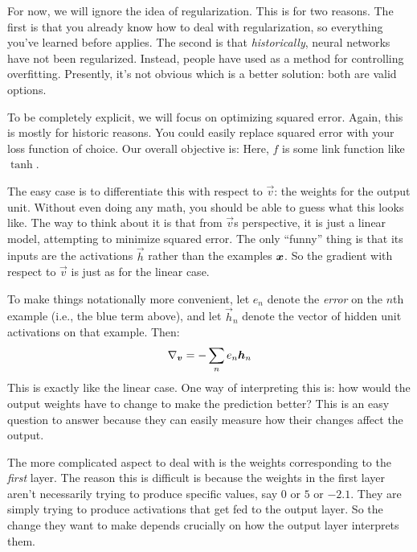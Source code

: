 For now, we will ignore the idea of regularization.  This is for two
reasons.  The first is that you already know how to deal with
regularization, so everything you've learned before applies.  The
second is that \emph{historically}, neural networks have not been
regularized.  Instead, people have used  as a
method for controlling overfitting.  Presently, it's not obvious which
is a better solution: both are valid options.

To be completely explicit, we will focus on optimizing squared error.
Again, this is mostly for historic reasons.  You could easily replace
squared error with your loss function of choice.  Our overall
objective is:
%
%
Here, $f$ is some link function like $\tanh$.

The easy case is to differentiate this with respect to $\vec v$: the
weights for the output unit.  Without even doing any math, you should
be able to guess what this looks like.  The way to think about it is
that from $\vec v$s perspective, it is just a linear model, attempting
to minimize squared error.  The only ``funny'' thing is that its
inputs are the activations $\vec h$ rather than the examples ${\boldsymbol{x}}$.
So the gradient with respect to $\vec v$ is just as for the linear
case.

To make things notationally more convenient, let $e_n$ denote the
\emph{error} on the $n$th example (i.e., the blue term above), and let
$\vec h_n$ denote the vector of hidden unit activations on that
example.  Then:
%
\begin{equation}
\nabla_{\boldsymbol{v}} = -\sum_n e_n \boldsymbol{h}_n 
\end{equation}
%
This is exactly like the linear case.  One way of interpreting this
is: how would the output weights have to change to make the prediction
better?  This is an easy question to answer because they can easily
measure how their changes affect the output.

The more complicated aspect to deal with is the weights corresponding
to the \emph{first} layer.  The reason this is difficult is because
the weights in the first layer aren't necessarily trying to produce
specific values, say $0$ or $5$ or $-2.1$.  They are simply trying to
produce activations that get fed to the output layer.  So the change
they want to make depends crucially on how the output layer interprets
them.

